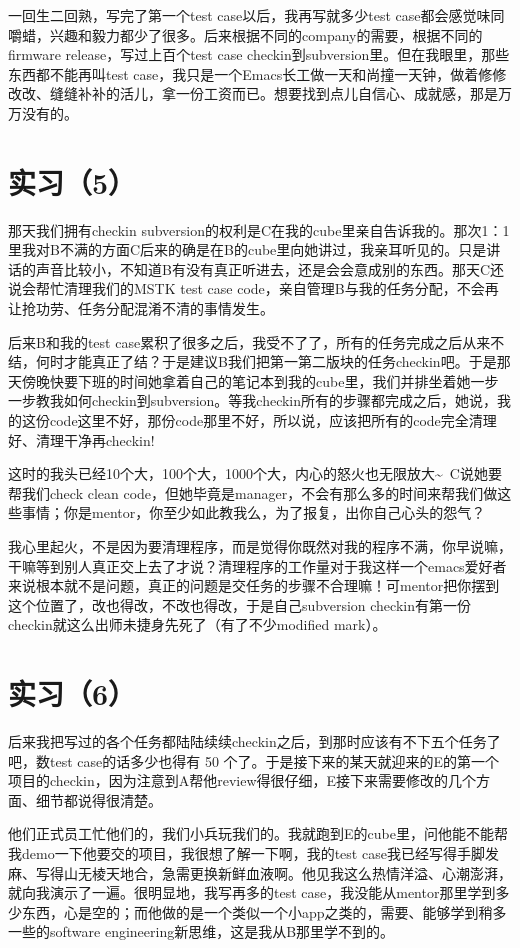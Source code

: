 \documentclass[12pt]{book}
\begin{document}
一回生二回熟，写完了第一个test case以后，我再写就多少test case都会感觉味同嚼蜡，兴趣和毅力都少了很多。后来根据不同的company的需要，根据不同的firmware release，写过上百个test case checkin到subversion里。但在我眼里，那些东西都不能再叫test case，我只是一个Emacs长工做一天和尚撞一天钟，做着修修改改、缝缝补补的活儿，拿一份工资而已。想要找到点儿自信心、成就感，那是万万没有的。

\section{实习（5）}
\label{sec-5-8}

那天我们拥有checkin subversion的权利是C在我的cube里亲自告诉我的。那次1：1里我对B不满的方面C后来的确是在B的cube里向她讲过，我亲耳听见的。只是讲话的声音比较小，不知道B有没有真正听进去，还是会会意成别的东西。那天C还说会帮忙清理我们的MSTK test case code，亲自管理B与我的任务分配，不会再让抢功劳、任务分配混淆不清的事情发生。

后来B和我的test case累积了很多之后，我受不了了，所有的任务完成之后从来不结，何时才能真正了结？于是建议B我们把第一第二版块的任务checkin吧。于是那天傍晚快要下班的时间她拿着自己的笔记本到我的cube里，我们并排坐着她一步一步教我如何checkin到subversion。等我checkin所有的步骤都完成之后，她说，我的这份code这里不好，那份code那里不好，所以说，应该把所有的code完全清理好、清理干净再checkin!

这时的我头已经10个大，100个大，1000个大，内心的怒火也无限放大\textasciitilde{}~C说她要帮我们check clean code，但她毕竟是manager，不会有那么多的时间来帮我们做这些事情；你是mentor，你至少如此教我么，为了报复，出你自己心头的怨气？

我心里起火，不是因为要清理程序，而是觉得你既然对我的程序不满，你早说嘛，干嘛等到别人真正交上去了才说？清理程序的工作量对于我这样一个emacs爱好者来说根本就不是问题，真正的问题是交任务的步骤不合理嘛！可mentor把你摆到这个位置了，改也得改，不改也得改，于是自己subversion checkin有第一份checkin就这么出师未捷身先死了（有了不少modified mark）。

\section{实习（6）}
\label{sec-5-9}

后来我把写过的各个任务都陆陆续续checkin之后，到那时应该有不下五个任务了吧，数test case的话多少也得有 50 个了。于是接下来的某天就迎来的E的第一个项目的checkin，因为注意到A帮他review得很仔细，E接下来需要修改的几个方面、细节都说得很清楚。

他们正式员工忙他们的，我们小兵玩我们的。我就跑到E的cube里，问他能不能帮我demo一下他要交的项目，我很想了解一下啊，我的test case我已经写得手脚发麻、写得山无棱天地合，急需更换新鲜血液啊。他见我这么热情洋溢、心潮澎湃，就向我演示了一遍。很明显地，我写再多的test case，我没能从mentor那里学到多少东西，心是空的；而他做的是一个类似一个小app之类的，需要、能够学到稍多一些的software engineering新思维，这是我从B那里学不到的。
\end{document}
